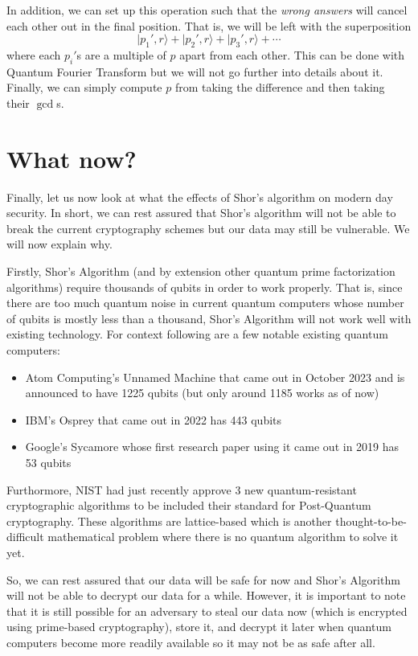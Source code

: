 \documentclass{article}
\begin{document}
In addition, we can set up this operation such that the \textit{wrong answers} will cancel each other out in the final position. That is, we will be left with the superposition
\[
    \lvert p_1', r \rangle + \lvert p_2', r \rangle + \lvert p_3', r \rangle + \cdots
\]
where each \(p_i'\)s are a multiple of \(p\) apart from each other. This can be done with Quantum Fourier Transform but we will not go further into details about it. Finally, we can simply compute \(p\) from taking the difference and then taking their \(\gcd\)s.

\section{What now?}

Finally, let us now look at what the effects of Shor's algorithm on modern day security. In short, we can rest assured that Shor's algorithm will not be able to break the current cryptography schemes but our data may still be vulnerable. We will now explain why.

Firstly, Shor's Algorithm (and by extension other quantum prime factorization algorithms) require thousands of qubits in order to work properly. That is, since there are too much quantum noise in current quantum computers whose number of qubits is mostly less than a thousand, Shor's Algorithm will not work well with existing technology. For context following are a few notable existing quantum computers:
\begin{itemize}
    \item Atom Computing's Unnamed Machine that came out in October 2023 and is announced to have 1225 qubits (but only around 1185 works as of now)
    \item IBM's Osprey that came out in 2022 has 443 qubits
    \item Google's Sycamore whose first research paper using it came out in 2019 has 53 qubits
\end{itemize}

Furthormore, NIST had just recently approve 3 new quantum-resistant cryptographic algorithms to be included their standard for Post-Quantum cryptography. These algorithms are lattice-based which is another thought-to-be-difficult mathematical problem where there is no quantum algorithm to solve it yet.

So, we can rest assured that our data will be safe for now and Shor's Algorithm will not be able to decrypt our data for a while. However, it is important to note that it is still possible for an adversary to steal our data now (which is encrypted using prime-based cryptography), store it, and decrypt it later when quantum computers become more readily available so it may not be as safe after all.
\end{document}
